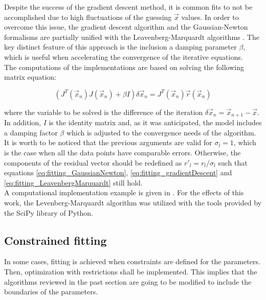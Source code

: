 \documentclass[openany]{book}
\begin{document}
Despite the success of the gradient descent method, it is common fits to not be accomplished due to high fluctuations of the guessing $\vec x$ values. In order to overcome this issue, the gradient descent algorithm and the Gaussian-Newton formalisms are partially unified with the Leavenberg-Marquardt algorithms \cite{watson_more_1978}. The key distinct feature of this approach is the inclusion a damping parameter $\beta$, which is useful when accelerating the convergence of the iterative equations.  \\

The computations of the implementations are based on solving the following matrix equation: 

\begin{equation}\label{eq:fitting_LeavenbergMarquardt}
	(J^{T}(\vec x_n) J(\vec x_n) + \beta I ) \delta \vec x_n = J^{T}(\vec x_n) \vec r(\vec x_n)
\end{equation}

where the variable to be solved is the difference of the iteration $\delta \vec x_n = \vec x_{n+1} - \vec x$. In addition, $I$ is the identity matrix and, as it was anticipated, the model includes a damping factor $\beta$ which is adjusted to the convergence needs of the algorithm. \\

It is worth to be noticed that the previous arguments are valid for $\sigma_l = 1$, which is the case when all the data points have comparable errors. Otherwise, the components of the residual vector should be redefined as $r'_l = r_l/\sigma_l$ such that equations \ref{eq:fitting_GaussianNewton}, \ref{eq:fitting_gradientDescent} and \ref{eq:fitting_LeavenbergMarquardt} still hold. \\

A computational implementation example is given in  \cite{ramadasan_chevaldonne_chateau_2017}. For the effects of this work, the Levenberg-Marquardt algorithm was utilized with the tools provided by the SciPy library of Python. 

\subsection{Constrained fitting} \label{sub:constrainedFitting}

In some cases, fitting is achieved when constraints are defined for the parameters. Then, optimization with restrictions shall be implemented. This implies that the algorithms reviewed in the past section are going to be modified to include the boundaries of the parameters. \\
\end{document}
